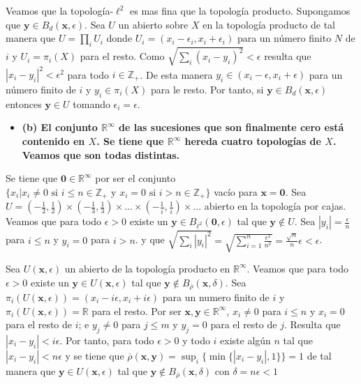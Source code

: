 \documentclass{article}
\newcommand{\vect}[1]{\boldsymbol{#1}}
\begin{document}
Veamos que la topología-$\ell^2$ es mas fina que la topología producto. Supongamos que $\vect{y}\in B_{d}(\vect{x},\epsilon)$. Sea $U$ un abierto sobre $X$ en la topología producto de tal manera que $U=\prod_i U_i$ donde $U_i=(x_i-\epsilon_i,x_i+\epsilon_i)$ para un número finito $N$ de $i$ y $U_i=\pi_i(X)$ para el resto.
Como $\sqrt{\sum_i (x_i-y_i)^2}<\epsilon$ resulta que $|x_i-y_i|^2<\epsilon^2$ para todo $i\in\mathbb{Z}_+$. De esta manera $y_i\in (x_i-\epsilon,x_i+\epsilon)$ para un número finito de $i$ y $y_i\in \pi_i(X)$ para le resto. Por tanto, si $\vect{y}\in B_{d}(\vect{x},\epsilon)$ entonces $\vect{y}\in U$ tomando $\epsilon_i=\epsilon$.
\begin{itemize}
\item \bf (b) \rm El conjunto $\mathbb{R}^\infty$ de las sucesiones que son finalmente cero está contenido en $X$. Se tiene que $\mathbb{R}^\infty$ hereda cuatro topologías de $X$. Veamos que son todas distintas.
\end{itemize}
Se tiene que $\vect{0}\in\mathbb{R}^\infty$ por ser el conjunto $\{x_i|x_i\neq 0\text{ si } i\leq n\in \mathbb{Z}_+ \text{ y }x_i=0\text{ si } i> n\in \mathbb{Z}_+\}$ vacío para $\vect{x}=\vect{0}$. Sea $U=(-\frac{1}{2},\frac{1}{2})\times (-\frac{1}{3},\frac{1}{3})\times...\times(-\frac{1}{i},\frac{1}{i})\times...$ abierto en la topología por cajas. Veamos que para todo $\epsilon>0$ existe un $\vect{y}\in B_{\ell^2}(\vect{0},\epsilon)$ tal que $\vect{y}\notin U$. Sea $|y_i|=\frac{\epsilon}{n}$ para $i\leq n$ y $y_i=0$ para $i>n$. y que $\sqrt{\sum_i|y_i|^2}=\sqrt{\sum_{i=1}^n\frac{\epsilon^2}{n^2}}=\frac{\sqrt{n}}{n}\epsilon<\epsilon$.

Sea $U(\vect{x},\epsilon)$ un abierto de la topología producto en $\mathbb{R}^\infty$. Veamos que para todo $\epsilon>0$ existe un $\vect{y}\in U(\vect{x},\epsilon)$ tal que $\vect{y}\notin B_{\overline{\rho}}(\vect{x},\delta)$. Sea $\pi_i(U(\vect{x},\epsilon))=(x_i-i\epsilon,x_i+i\epsilon)$ para un numero finito de $i$ y $\pi_i(U(\vect{x},\epsilon))=\mathbb{R}$ para el resto. Por ser $\vect{x},\vect{y}\in \mathbb{R}^\infty$, $x_i\neq 0$ para $i\leq n$ y $x_i=0$ para el resto de $i$; e $y_j\neq 0$ para $j\leq m$ y $y_j=0$ para el resto de $j$. Resulta que $|x_i-y_i|<i\epsilon$. Por tanto, para todo $\epsilon>0$ y todo $i$ existe algún $n$ tal que $|x_i-y_i|< n\epsilon$ y se tiene que $\overline{\rho}(\vect{x},\vect{y})=\sup_i\{\min\{|x_i-y_i|,1\}\}=1$ de tal manera que $\vect{y}\in U(\vect{x},\epsilon)$ tal que $\vect{y}\notin B_{\overline{\rho}}(\vect{x},\delta)$ con $\delta=n\epsilon<1$
\end{document}
